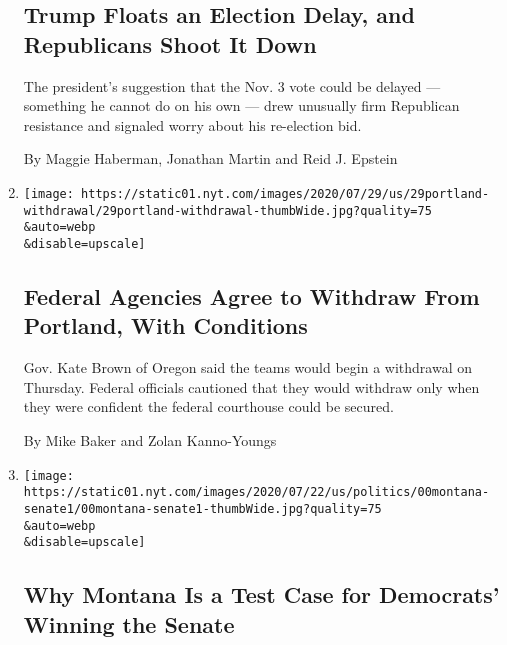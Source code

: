 \begin{enumerate}
  \hypertarget{trump-floats-an-election-delay-and-republicans-shoot-it-down}{%
  \subsection{Trump Floats an Election Delay, and Republicans Shoot It
  Down}\label{trump-floats-an-election-delay-and-republicans-shoot-it-down}}

  The president's suggestion that the Nov. 3 vote could be delayed ---
  something he cannot do on his own --- drew unusually firm Republican
  resistance and signaled worry about his re-election bid.

  By Maggie Haberman, Jonathan Martin and Reid J. Epstein
\item
  \href{/2020/07/29/us/protests-portland-federal-withdrawal.html}{}

  \texttt{[image: https://static01.nyt.com/images/2020/07/29/us/29portland-withdrawal/29portland-withdrawal-thumbWide.jpg?quality=75\\\&auto=webp\\\&disable=upscale]}

  \hypertarget{federal-agencies-agree-to-withdraw-from-portland-with-conditions}{%
  \subsection{Federal Agencies Agree to Withdraw From Portland, With
  Conditions}\label{federal-agencies-agree-to-withdraw-from-portland-with-conditions}}

  Gov. Kate Brown of Oregon said the teams would begin a withdrawal on
  Thursday. Federal officials cautioned that they would withdraw only
  when they were confident the federal courthouse could be secured.

  By Mike Baker and Zolan Kanno-Youngs
\item
  \href{/2020/07/27/us/politics/montana-senate-bullock-daines.html}{}

  \texttt{[image: https://static01.nyt.com/images/2020/07/22/us/politics/00montana-senate1/00montana-senate1-thumbWide.jpg?quality=75\\\&auto=webp\\\&disable=upscale]}

  \hypertarget{why-montana-is-a-test-case-for-democrats-winning-the-senate}{%
  \subsection{Why Montana Is a Test Case for Democrats' Winning the
  Senate}\label{why-montana-is-a-test-case-for-democrats-winning-the-senate}}


\end{enumerate}

